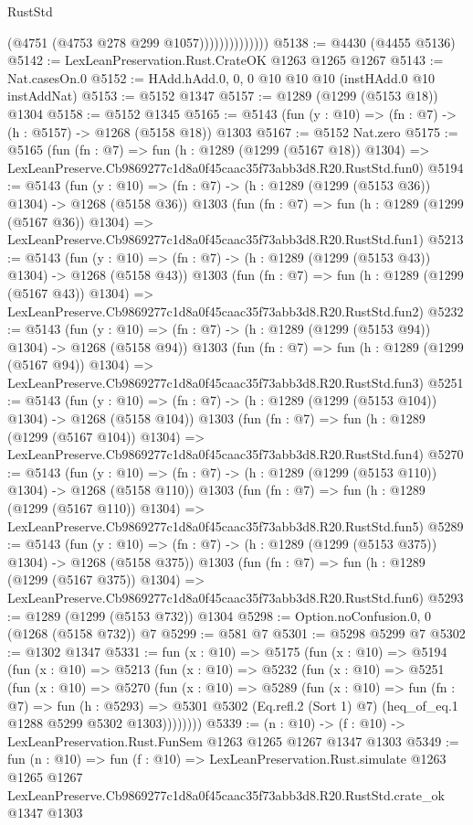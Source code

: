 \begin{lexlean}{RustStd}
\begin{coremodule}
                            (@4751 (@4753 @278 @299 @1057))))))))))))))
@5138 := @4430 (@4455 @5136)
@5142 := LexLeanPreservation.Rust.CrateOK @1263 @1265 @1267
@5143 := Nat.casesOn.{0}
@5152 := HAdd.hAdd.{0, 0, 0} @10 @10 @10 (instHAdd.{0} @10 instAddNat)
@5153 := @5152 @1347
@5157 := @1289 (@1299 (@5153 @18)) @1304
@5158 := @5152 @1345
@5165 := @5143 (fun (y : @10) => (fn : @7) -> (h : @5157) -> @1268 (@5158 @18)) @1303
@5167 := @5152 Nat.zero
@5175 := @5165
    (fun (fn : @7) =>
    fun (h : @1289 (@1299 (@5167 @18)) @1304) =>
    LexLeanPreserve.Cb9869277c1d8a0f45caac35f73abb3d8.R20.RustStd.fun0)
@5194 := @5143
    (fun (y : @10) => (fn : @7) -> (h : @1289 (@1299 (@5153 @36)) @1304) -> @1268 (@5158 @36))
    @1303
    (fun (fn : @7) =>
    fun (h : @1289 (@1299 (@5167 @36)) @1304) =>
    LexLeanPreserve.Cb9869277c1d8a0f45caac35f73abb3d8.R20.RustStd.fun1)
@5213 := @5143
    (fun (y : @10) => (fn : @7) -> (h : @1289 (@1299 (@5153 @43)) @1304) -> @1268 (@5158 @43))
    @1303
    (fun (fn : @7) =>
    fun (h : @1289 (@1299 (@5167 @43)) @1304) =>
    LexLeanPreserve.Cb9869277c1d8a0f45caac35f73abb3d8.R20.RustStd.fun2)
@5232 := @5143
    (fun (y : @10) => (fn : @7) -> (h : @1289 (@1299 (@5153 @94)) @1304) -> @1268 (@5158 @94))
    @1303
    (fun (fn : @7) =>
    fun (h : @1289 (@1299 (@5167 @94)) @1304) =>
    LexLeanPreserve.Cb9869277c1d8a0f45caac35f73abb3d8.R20.RustStd.fun3)
@5251 := @5143
    (fun (y : @10) => (fn : @7) -> (h : @1289 (@1299 (@5153 @104)) @1304) -> @1268 (@5158 @104))
    @1303
    (fun (fn : @7) =>
    fun (h : @1289 (@1299 (@5167 @104)) @1304) =>
    LexLeanPreserve.Cb9869277c1d8a0f45caac35f73abb3d8.R20.RustStd.fun4)
@5270 := @5143
    (fun (y : @10) => (fn : @7) -> (h : @1289 (@1299 (@5153 @110)) @1304) -> @1268 (@5158 @110))
    @1303
    (fun (fn : @7) =>
    fun (h : @1289 (@1299 (@5167 @110)) @1304) =>
    LexLeanPreserve.Cb9869277c1d8a0f45caac35f73abb3d8.R20.RustStd.fun5)
@5289 := @5143
    (fun (y : @10) => (fn : @7) -> (h : @1289 (@1299 (@5153 @375)) @1304) -> @1268 (@5158 @375))
    @1303
    (fun (fn : @7) =>
    fun (h : @1289 (@1299 (@5167 @375)) @1304) =>
    LexLeanPreserve.Cb9869277c1d8a0f45caac35f73abb3d8.R20.RustStd.fun6)
@5293 := @1289 (@1299 (@5153 @732)) @1304
@5298 := Option.noConfusion.{0, 0} (@1268 (@5158 @732)) @7
@5299 := @581 @7
@5301 := @5298 @5299 @7
@5302 := @1302 @1347
@5331 := fun (x : @10) =>
  @5175
    (fun (x : @10) =>
    @5194
      (fun (x : @10) =>
      @5213
        (fun (x : @10) =>
        @5232
          (fun (x : @10) =>
          @5251
            (fun (x : @10) =>
            @5270
              (fun (x : @10) =>
              @5289
                (fun (x : @10) =>
                fun (fn : @7) =>
                fun (h : @5293) =>
                @5301 @5302 (Eq.refl.{2} (Sort 1) @7) (heq_of_eq.{1} @1288 @5299 @5302 @1303))))))))
@5339 := (n : @10) -> (f : @10) -> LexLeanPreservation.Rust.FunSem @1263 @1265 @1267 @1347 @1303
@5349 := fun (n : @10) =>
  fun (f : @10) =>
  LexLeanPreservation.Rust.simulate
    @1263
    @1265
    @1267
    LexLeanPreserve.Cb9869277c1d8a0f45caac35f73abb3d8.R20.RustStd.crate_ok
    @1347
    @1303
\end{coremodule}
\end{lexlean}
